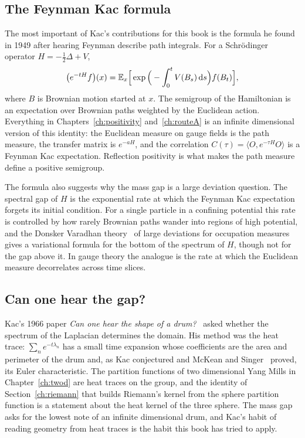 \subsection{The Feynman Kac formula}\label{sec:c5fk}

The most important of Kac's contributions for this book is the formula he found in 1949 after hearing Feynman describe path integrals. For a Schr\"odinger operator $H=-\frac12\Delta+V$,
\[
\big(e^{-tH}f\big)(x)=\mathbb{E}_x\Big[\exp\Big(-\int_0^tV(B_s)\,\mathrm ds\Big)f(B_t)\Big],
\]
where $B$ is Brownian motion started at $x$. The semigroup of the Hamiltonian is an expectation over Brownian paths weighted by the Euclidean action. Everything in Chapters~\ref{ch:positivity} and~\ref{ch:routeA} is an infinite dimensional version of this identity: the Euclidean measure on gauge fields is the path measure, the transfer matrix is $e^{-aH}$, and the correlation $C(\tau)=\langle O,e^{-\tau H}O\rangle$ is a Feynman Kac expectation. Reflection positivity is what makes the path measure define a positive semigroup.

The formula also suggests why the mass gap is a large deviation question. The spectral gap of $H$ is the exponential rate at which the Feynman Kac expectation forgets its initial condition. For a single particle in a confining potential this rate is controlled by how rarely Brownian paths wander into regions of high potential, and the Donsker Varadhan theory~\cite{DV75} of large deviations for occupation measures gives a variational formula for the bottom of the spectrum of $H$, though not for the gap above it. In gauge theory the analogue is the rate at which the Euclidean measure decorrelates across time slices.

\subsection{Can one hear the gap?}

Kac's 1966 paper \emph{Can one hear the shape of a drum?}~\cite{Ka66} asked whether the spectrum of the Laplacian determines the domain. His method was the heat trace: $\sum_ne^{-t\lambda_n}$ has a small time expansion whose coefficients are the area and perimeter of the drum and, as Kac conjectured and McKean and Singer~\cite{MS67} proved, its Euler characteristic. The partition functions of two dimensional Yang Mills in Chapter~\ref{ch:twod} are heat traces on the group, and the identity of Section~\ref{ch:riemann} that builds Riemann's kernel from the sphere partition function is a statement about the heat kernel of the three sphere. The mass gap asks for the lowest note of an infinite dimensional drum, and Kac's habit of reading geometry from heat traces is the habit this book has tried to apply.

